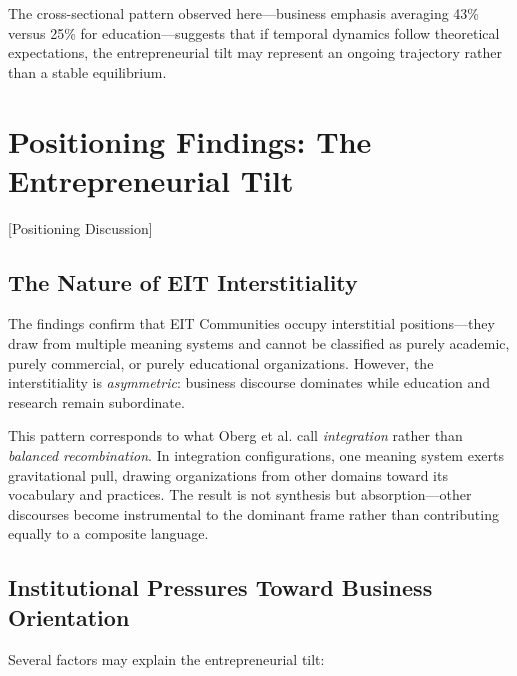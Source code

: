 \documentclass[../main.tex]{subfiles}
\begin{document}
The cross-sectional pattern observed here---business emphasis averaging 43\% versus 25\% for education---suggests that if temporal dynamics follow theoretical expectations, the entrepreneurial tilt may represent an ongoing trajectory rather than a stable equilibrium.


\section{Positioning Findings: The Entrepreneurial Tilt}[Positioning Discussion]

\subsection{The Nature of EIT Interstitiality}

The findings confirm that EIT Communities occupy interstitial positions---they draw from multiple meaning systems and cannot be classified as purely academic, purely commercial, or purely educational organizations. However, the interstitiality is \textit{asymmetric}: business discourse dominates while education and research remain subordinate.

This pattern corresponds to what Oberg et al. \citeyear{oberg2017culture} call \textit{integration} rather than \textit{balanced recombination}. In integration configurations, one meaning system exerts gravitational pull, drawing organizations from other domains toward its vocabulary and practices. The result is not synthesis but absorption---other discourses become instrumental to the dominant frame rather than contributing equally to a composite language.

\subsection{Institutional Pressures Toward Business Orientation}

Several factors may explain the entrepreneurial tilt:
\end{document}
